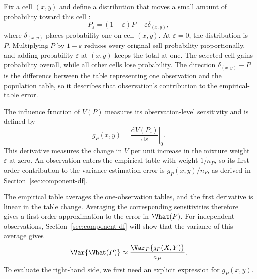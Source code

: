 \begin{samepage}
Fix a cell \((x,y)\) and define a distribution that moves a small amount
of probability toward this cell \citep{hampel1974,vanderVaart1998}:
\begin{equation}
  P_\varepsilon
  =(1-\varepsilon)P+\varepsilon\delta_{(x,y)},
  \label{eq:contamination-path}
\end{equation}
where \(\delta_{(x,y)}\) places probability one on cell \((x,y)\). At
\(\varepsilon=0\), the distribution is \(P\). Multiplying \(P\) by
\(1-\varepsilon\) reduces every original cell probability proportionally,
and adding probability \(\varepsilon\) at \((x,y)\) keeps the total at
one. The selected cell gains probability overall, while all other cells
lose probability. The direction \(\delta_{(x,y)}-P\) is the
difference between the table representing one observation and the
population table, so it describes that observation's contribution to
the empirical-table error.
\par
\end{samepage}

The influence function of \(V(P)\) measures its observation-level
sensitivity and is defined by
\begin{equation}
  g_P(x,y)
  =
  \left.
  \frac{\mathrm d V(P_\varepsilon)}{\mathrm d\varepsilon}
  \right|_{0}.
  \label{eq:g-definition}
\end{equation}
This derivative measures the change in \(V\) per unit increase in the
mixture weight \(\varepsilon\) at zero. An observation enters the
empirical table with weight \(1/n_P\), so its first-order contribution
to the variance-estimation error is \(g_P(x,y)/n_P\), as derived in
Section~\ref{sec:component-df}.

The empirical table averages the one-observation tables, and the first
derivative is linear in the table change. Averaging the corresponding
sensitivities therefore gives a first-order approximation to the error
in \(\Vhat(P)\). For independent observations,
Section~\ref{sec:component-df} will show that the variance of this average
gives
\begin{equation*}
  \Var\{\Vhat(P)\}
  \approx\frac{\Var_P\{g_P(X,Y)\}}{n_P}.
\end{equation*}
To evaluate the right-hand side, we first need an explicit expression
for \(g_P(x,y)\).

